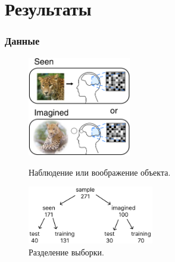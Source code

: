 \documentclass{beamer}
\begin{document}
	\section{Результаты}
	\begin{frame} 
		\frametitle{Данные}
		\begin{figure}
			\begin{minipage}{4.5cm}
				\includegraphics[width=4.5cm]{../images/data_1.png}
				\caption{Наблюдение или воображение объекта.} 
				\label{fg:12}
			\end{minipage}\hfill
			\begin{minipage}{5.5cm}
				\includegraphics[width=5.5cm]{../images/data_2.pdf}
				\caption{Разделение выборки.}
				\label{fg:13}
			\end{minipage}	
		\end{figure}
	\end{frame}
\end{document}
